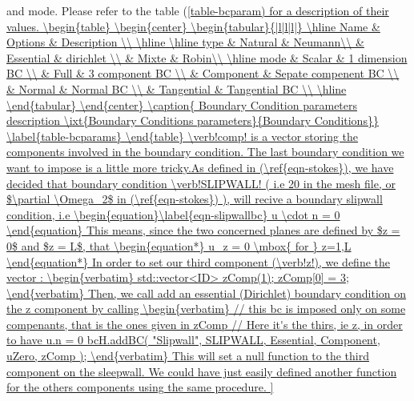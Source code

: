 and mode. Please refer to the table (\ref{table-bcparam) for a description of their values.

\begin{table}
\begin{center}
\begin{tabular}{|l|l|l|}
\hline
Name & Options & Description \\
\hline \hline
type &  Natural & Neumann\\
& Essential & dirichlet \\
& Mixte & Robin\\

\hline
mode & Scalar & 1 dimension BC \\
& Full & 3 component BC \\
& Component  & Sepate compenent BC \\
& Normal & Normal BC \\
& Tangential & Tangential BC \\
\hline

\end{tabular}
\end{center}
\caption{ Boundary Condition parameters description
\ixt{Boundary Conditions parameters}{Boundary Conditions}}
\label{table-bcparams}
\end{table}

\verb!comp! is a vector storing the components involved in the boundary condition.
The last boundary condition we want to impose is a little more tricky.As defined
in (\ref{eqn-stokes}), we have decided that boundary condition \verb!SLIPWALL! ( i.e 20 in the mesh file, or $\partial \Omega_2$ in (\ref{eqn-stokes}) ), will recive
a boundary slipwall condition, i.e
\begin{equation}\label{eqn-slipwallbc}
u \cdot n = 0
\end{equation}
This means, since the two concerned planes are defined by $z = 0$ and $z = L$, that
\begin{equation*}
u_z = 0 \mbox{ for } z=1,L
\end{equation*}
In order to set our third component (\verb!z!), we define the vector :
\begin{verbatim}
    std::vector<ID> zComp(1);
    zComp[0] = 3;
\end{verbatim}
Then, we call add an essential (Dirichlet) boundary condition on the z component by calling
\begin{verbatim}
    // this bc is imposed only on some compenants, that is the ones given in zComp
    // Here it's the thirs, ie z, in order to have u.n = 0
    bcH.addBC( "Slipwall", SLIPWALL, Essential, Component, uZero, zComp );
\end{verbatim}
This will set a null function to the third component on the sleepwall. We could have just easily defined
another function for the others components using the same procedure.

}
